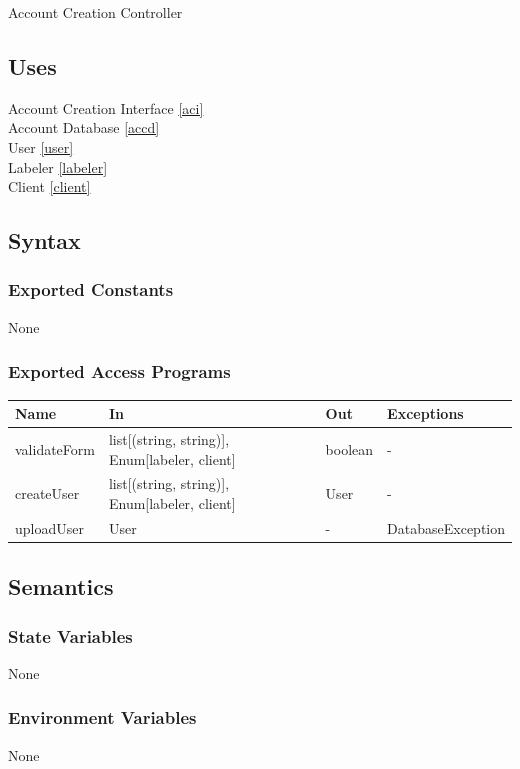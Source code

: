 \documentclass[12pt, titlepage]{article}
\begin{document}
Account Creation Controller

\subsection{Uses}

Account Creation Interface \ref{aci}\\
Account Database \ref{accd} \\
User \ref{user} \\
Labeler \ref{labeler} \\
Client \ref{client}

\subsection{Syntax}

\subsubsection{Exported Constants}
None
\subsubsection{Exported Access Programs}

\begin{center}
\begin{tabular}{p{2cm} p{4cm} p{4cm} p{2cm}}
\hline
\textbf{Name} & \textbf{In} & \textbf{Out} & \textbf{Exceptions} \\
\hline
validateForm & list[(string, string)], Enum[labeler, client] & boolean & - \\
createUser & list[(string, string)], Enum[labeler, client] & User & - \\
uploadUser & User & - & DatabaseException \\
\hline
\end{tabular}
\end{center}

\subsection{Semantics}

\subsubsection{State Variables}
None

\subsubsection{Environment Variables}
None
\end{document}
